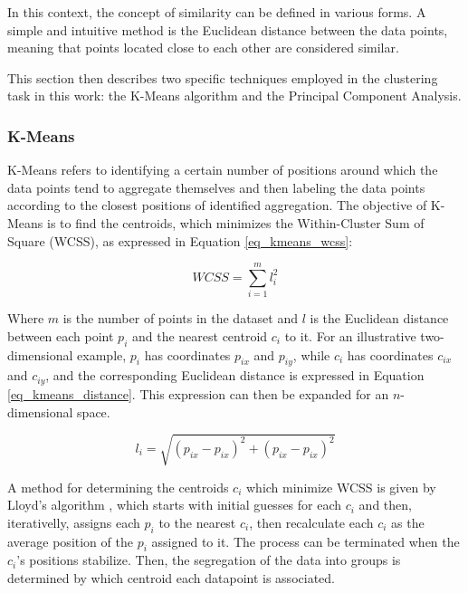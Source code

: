 \documentclass[conference]{IEEEtran}
\begin{document}
In this context, the concept of similarity can be defined in various forms. A simple and intuitive method is the Euclidean distance between the data points, meaning that points located close to each other are considered similar.

This section then describes two specific techniques employed in the clustering task in this work: the K-Means algorithm and the Principal Component Analysis.

\subsubsection{K-Means}

K-Means refers to identifying a certain number of positions around which the data points tend to aggregate themselves and then labeling the data points according to the closest positions of identified aggregation. The objective of K-Means is to find the centroids, which minimizes the Within-Cluster Sum of Square (WCSS), as expressed in Equation \ref{eq_kmeans_wcss}: 


\begin{equation}
	\label{eq_kmeans_wcss}
	WCSS=\sum_{i = 1}^{m} l_{i}^{2}
\end{equation}

Where $m$ is the number of points in the dataset and $l$ is the Euclidean distance between each point $p_{i}$ and the nearest centroid $c_{i}$ to it. For an illustrative two-dimensional example, $p_{i}$ has coordinates $p_{ix}$ and $p_{iy}$, while $c_{i}$ has coordinates $c_{ix}$ and $c_{iy}$, and the corresponding Euclidean distance is expressed in Equation \ref{eq_kmeans_distance}. This expression can then be expanded for an $n$-dimensional space.

\begin{equation}
	\label{eq_kmeans_distance}
	l_{i}=\sqrt{(p_{ix} - p_{ix})^{2} + (p_{ix} - p_{ix})^{2}}
\end{equation}

A method for determining the centroids $c_{i}$ which minimize WCSS is given by Lloyd's algorithm \cite{b3}, which starts with initial guesses for each $c_{i}$ and then, iterativelly, assigns each $p_{i}$ to the nearest $c_{i}$, then recalculate each $c_{i}$ as the average position of the $p_{i}$ assigned to it. The process can be terminated when the $c_{i}$'s positions stabilize. Then, the segregation of the data into groups is determined by which centroid each datapoint is associated.
\end{document}
